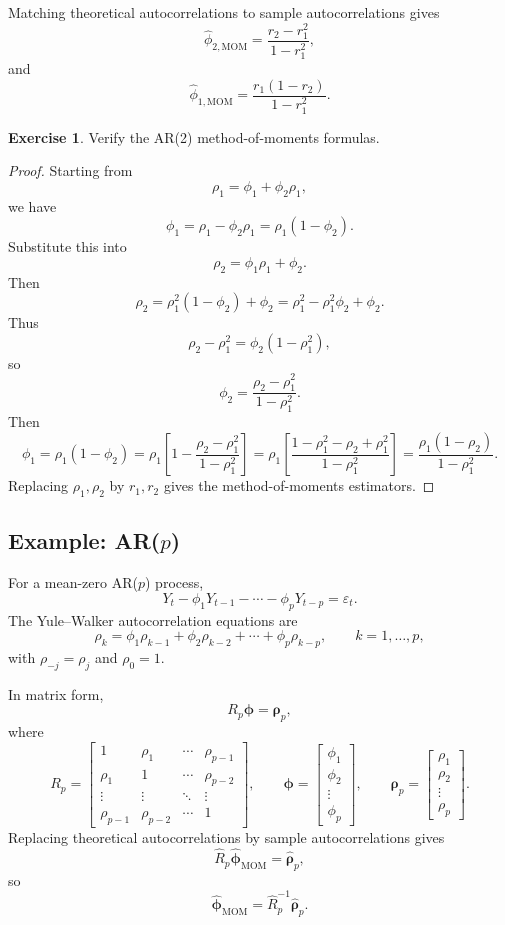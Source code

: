 \documentclass[12pt,oneside]{book}
\numberwithin{equation}{section}
\theoremstyle{definition}
\newtheorem{exercise}{Exercise}[section]
\theoremstyle{plain}
\theoremstyle{remark}
\begin{document}
Matching theoretical autocorrelations to sample autocorrelations gives
\[
\widehat{\phi}_{2,\mathrm{MOM}}
=
\frac{r_2-r_1^2}{1-r_1^2},
\]
and
\[
\widehat{\phi}_{1,\mathrm{MOM}}
=
\frac{r_1(1-r_2)}{1-r_1^2}.
\]

\begin{exercise}
Verify the AR(2) method-of-moments formulas.
\end{exercise}

\begin{proof}
Starting from
\[
\rho_1=\phi_1+\phi_2\rho_1,
\]
we have
\[
\phi_1=\rho_1-\phi_2\rho_1=\rho_1(1-\phi_2).
\]
Substitute this into
\[
\rho_2=\phi_1\rho_1+\phi_2.
\]
Then
\[
\rho_2=\rho_1^2(1-\phi_2)+\phi_2
=
\rho_1^2-\rho_1^2\phi_2+\phi_2.
\]
Thus
\[
\rho_2-\rho_1^2
=
\phi_2(1-\rho_1^2),
\]
so
\[
\phi_2=
\frac{\rho_2-\rho_1^2}{1-\rho_1^2}.
\]
Then
\[
\phi_1
=
\rho_1(1-\phi_2)
=
\rho_1
\left[
1-
\frac{\rho_2-\rho_1^2}{1-\rho_1^2}
\right]
=
\rho_1
\left[
\frac{1-\rho_1^2-\rho_2+\rho_1^2}{1-\rho_1^2}
\right]
=
\frac{\rho_1(1-\rho_2)}{1-\rho_1^2}.
\]
Replacing $\rho_1,\rho_2$ by $r_1,r_2$ gives the method-of-moments estimators.
\end{proof}

\subsection{Example: AR($p$)}

For a mean-zero AR($p$) process,
\[
Y_t-\phi_1Y_{t-1}-\cdots-\phi_pY_{t-p}=\varepsilon_t.
\]
The Yule--Walker autocorrelation equations are
\[
\rho_k
=
\phi_1\rho_{k-1}
+
\phi_2\rho_{k-2}
+\cdots+
\phi_p\rho_{k-p},
\qquad k=1,\ldots,p,
\]
with $\rho_{-j}=\rho_j$ and $\rho_0=1$.

In matrix form,
\[
R_p\bm{\phi}=\bm{\rho}_p,
\]
where
\[
R_p
=
\begin{bmatrix}
1 & \rho_1 & \cdots & \rho_{p-1}\\
\rho_1 & 1 & \cdots & \rho_{p-2}\\
\vdots & \vdots & \ddots & \vdots\\
\rho_{p-1} & \rho_{p-2} & \cdots & 1
\end{bmatrix},
\qquad
\bm{\phi}
=
\begin{bmatrix}
\phi_1\\
\phi_2\\
\vdots\\
\phi_p
\end{bmatrix},
\qquad
\bm{\rho}_p
=
\begin{bmatrix}
\rho_1\\
\rho_2\\
\vdots\\
\rho_p
\end{bmatrix}.
\]
Replacing theoretical autocorrelations by sample autocorrelations gives
\[
\widehat{R}_p\widehat{\bm{\phi}}_{\mathrm{MOM}}
=
\widehat{\bm{\rho}}_p,
\]
so
\[
\widehat{\bm{\phi}}_{\mathrm{MOM}}
=
\widehat{R}_p^{-1}\widehat{\bm{\rho}}_p.
\]
\end{document}
